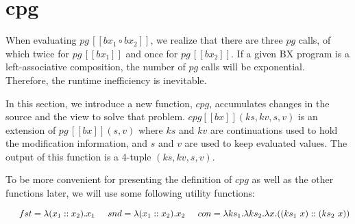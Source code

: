 \documentclass[runningheads]{llncs}
\newcommand{\tab}{\hspace*{5mm}}
\newcommand{\pg}[3]{pg \, [\![#1]\!] (#2, #3)}
\newcommand{\pginline}[1]{pg \, [\![#1]\!]}
\newcommand{\cpg}[5]{cpg [\![#1]\!] (#2, #3, #4, #5)}
\begin{document}

\section{cpg}

When evaluating $\pginline{bx_1 \circ bx_2}$, we realize that there are three $pg$ calls, of which twice for $\pginline{bx_1}$ and once for $\pginline{bx_2}$. If a given BX program is a left-associative composition, the number of $pg$ calls will be exponential. Therefore, the runtime inefficiency is inevitable.

In this section, we introduce a new function, $cpg$, accumulates changes in the source and the view to solve that problem. $\cpg{bx}{ks}{kv}{s}{v}$ is an extension of $\pg{bx}{s}{v}$ where $ks$ and $kv$ are continuations used to hold the modification information, and $s$ and $v$ are used to keep evaluated values. The output of this function is a 4-tuple $(ks, kv, s, v)$.

To be more convenient for presenting the definition of $cpg$ as well as the other functions later, we will use some following utility functions:

$\tab fst = \lambda (x_1 :: x_2). x_1\\
 \tab snd = \lambda (x_1 :: x_2). x_2\\
 \tab con = \lambda ks_1. \lambda ks_2. \lambda x. ((ks_1 \ x) :: (ks_2 \ x))$\\
\end{document}
